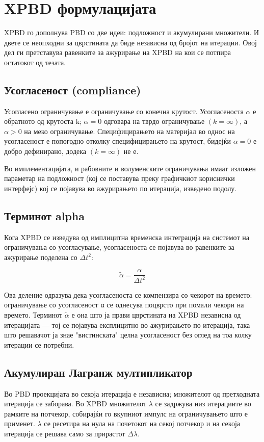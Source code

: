 \section{XPBD формулацијата}

XPBD го дополнува PBD со две идеи: подложност и акумулирани множители. И двете се неопходни за цврстината да биде независна од бројот на итерации. Овој дел ги претставува равенките за ажурирање на XPBD на кои се потпира остатокот од тезата.

\subsection{Усогласеност (compliance)}
Усогласено ограничување е ограничување со конечна крутост. Усогласеноста  $\alpha$ е обратното од крутоста k; $\alpha = 0$ одговара на тврдо ограничување $ (k = \infty)$, а $\alpha > 0$ на меко ограничување. Специфицирањето на материјал во однос на усогласеност е попогодно отколку специфицирањето на крутост, бидејќи $\alpha = 0$ е добро дефинирано, додека $ (k = \infty)$ не е.

Во имплементацијата, и рабовните и волуменските ограничувања имаат изложен параметар на подложност (кој се поставува преку графичкиот кориснички интерфејс) кој се појавува во ажурирањето по итерација, изведено подолу.


\subsection{Терминот alpha}
Кога XPBD се изведува од имплицитна временска интеграција на системот на ограничувања со усогласување, усогласеноста се појавува во равенките за ажурирање поделена со $\Delta t^2$:

$$\tilde{\alpha} = \frac{\alpha}{\Delta t^2}$$

Ова деление одразува дека усогласеноста се компензира со чекорот на времето: ограничување со усогласеност α се однесува поцврсто при помали чекори на времето. Терминот $\tilde{\alpha}$ е она што ја прави цврстината на XPBD независна од итерацијата — тој се појавува експлицитно во ажурирањето по итерација, така што решавачот ја знае "вистинската" целна усогласеност без оглед на тоа колку итерации се потребни.

\subsection{Акумулиран Лагранж мултипликатор}
Во PBD проекцијата во секоја итерација е независна; множителот од претходната итерација се заборава. Во XPBD множителот $\lambda$ се задржува низ итерациите во рамките на потчекор, собирајќи го вкупниот импулс на ограничувањето што е применет. $\lambda$ се ресетира на нула на почетокот на секој потчекор и на секоја итерација се решава само за прирастот $\Delta \lambda$.


